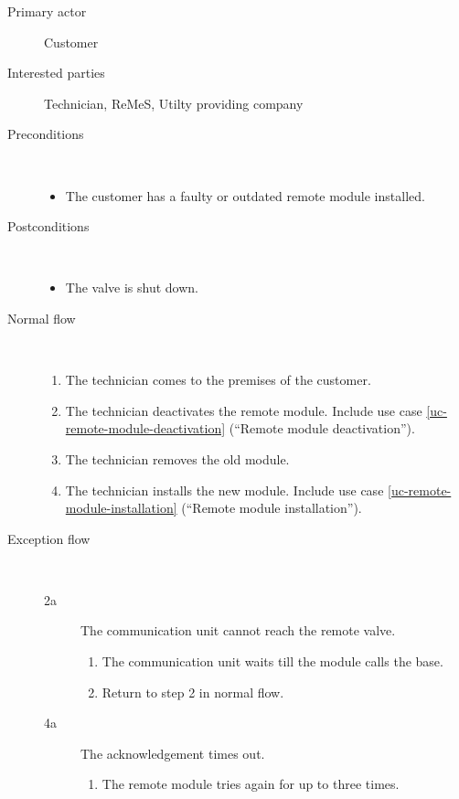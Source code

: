 \begin{description}
	\item[Primary actor] Customer
	\item[Interested parties] Technician, ReMeS, Utilty providing company
	\item[Preconditions] \ 
	\begin{itemize}
		\item The customer has a faulty or outdated remote module installed.
	\end{itemize}
	\item[Postconditions] \ 
	\begin{itemize}
		\item The valve is shut down.
	\end{itemize}
	\item[Normal flow] \ 
	\begin{enumerate}
	  	\item The technician comes to the premises of the customer.
	  	\item The technician deactivates the remote module. Include use case
	  	\ref{uc-remote-module-deactivation} (``Remote module deactivation'').
	  	\item The technician removes the old module.
	  	\item The technician installs the new module. Include use case
	  	\ref{uc-remote-module-installation} (``Remote module installation'').
	\end{enumerate}
	\item[Exception flow] \ 
	\begin{description}
		\item[2a] The communication unit cannot reach the remote valve.
		\begin{enumerate}
		  \item The communication unit waits till the module calls the base.
		  \item Return to step 2 in normal flow.
		\end{enumerate}
		\item[4a] The acknowledgement times out.
		\begin{enumerate}
			\item The remote module tries again for up to three times.
		\end{enumerate}
	\end{description}
\end{description}